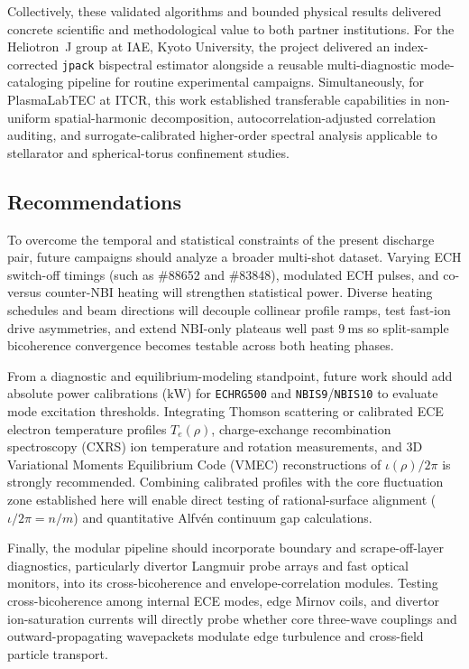 Collectively, these validated algorithms and bounded physical results delivered concrete scientific and methodological value to both partner institutions. For the Heliotron~J group at IAE, Kyoto University, the project delivered an index-corrected \texttt{jpack} bispectral estimator alongside a reusable multi-diagnostic mode-cataloging pipeline for routine experimental campaigns. Simultaneously, for PlasmaLabTEC at ITCR, this work established transferable capabilities in non-uniform spatial-harmonic decomposition, autocorrelation-adjusted correlation auditing, and surrogate-calibrated higher-order spectral analysis applicable to stellarator and spherical-torus confinement studies.

\subsection{Recommendations}
\label{subsec:recommendations}

To overcome the temporal and statistical constraints of the present discharge pair, future campaigns should analyze a broader multi-shot dataset. Varying ECH switch-off timings (such as \#88652 and \#83848), modulated ECH pulses, and co- versus counter-NBI heating will strengthen statistical power. Diverse heating schedules and beam directions will decouple collinear profile ramps, test fast-ion drive asymmetries, and extend $\mathrm{NBI}$-only plateaus well past $9~\mathrm{ms}$ so split-sample bicoherence convergence becomes testable across both heating phases.

From a diagnostic and equilibrium-modeling standpoint, future work should add absolute power calibrations ($\mathrm{kW}$) for \texttt{ECHRG500} and \texttt{NBIS9}/\texttt{NBIS10} to evaluate mode excitation thresholds. Integrating Thomson scattering or calibrated ECE electron temperature profiles $T_e(\rho)$, charge-exchange recombination spectroscopy (CXRS) ion temperature and rotation measurements, and 3D Variational Moments Equilibrium Code (VMEC) reconstructions of $\iota(\rho)/2\pi$ is strongly recommended. Combining calibrated profiles with the core fluctuation zone established here will enable direct testing of rational-surface alignment ($\iota/2\pi = n/m$) and quantitative Alfv\'en continuum gap calculations.

Finally, the modular pipeline should incorporate boundary and scrape-off-layer diagnostics, particularly divertor Langmuir probe arrays and fast optical monitors, into its cross-bicoherence and envelope-correlation modules. Testing cross-bicoherence among internal ECE modes, edge Mirnov coils, and divertor ion-saturation currents will directly probe whether core three-wave couplings and outward-propagating wavepackets modulate edge turbulence and cross-field particle transport.

